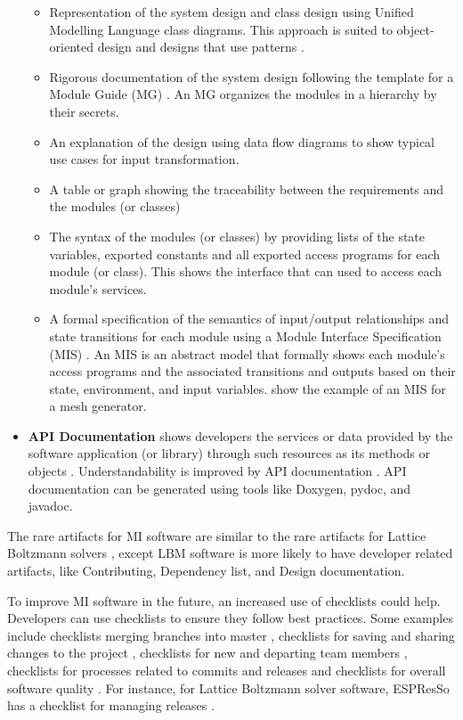 \documentclass[11pt]{article}
\begin{document}
\begin{itemize}
\begin{itemize}
	\item Representation of the system design and class design using Unified
	Modelling Language class diagrams. This approach is suited to
	object-oriented design and designs that use patterns \citep{Gamma1995}.
	\item Rigorous documentation of the system design following the template for
	a Module Guide (MG) \citep{ParnasEtAl1984}.  An MG organizes the modules in
	a hierarchy by their secrets.
	\item An explanation of the design using data flow diagrams to show typical use cases
	for input transformation.
	\item A table or graph showing the traceability between the requirements and
	the modules (or classes)
	\item The syntax of the modules (or classes) by providing lists of the state
	variables, exported constants and all exported access programs for each
	module (or class).  This shows the interface that can used to access each
	module's services.
	\item A formal specification of the semantics of input/output relationships
	and state transitions for each module using a Module Interface Specification
	(MIS) \citep{HoffmanAndStrooper1995}. An MIS is an abstract model that
	formally shows each module's access programs and the associated transitions
	and outputs based on their state, environment, and input variables.
	\citet{ElSheikhEtAl2004, SmithAndYu2009} show the example of an MIS for a
	mesh generator.
\end{itemize}

\item \textbf{API Documentation} shows developers the services or data provided
by the software application (or library) through such resources as its methods
or objects \citep{MengEtAl2018}.  Understandability is improved by API
documentation \citep{MengEtAl2018}. API documentation can be generated using
tools like Doxygen, pydoc, and javadoc.

\end{itemize}

The rare artifacts for MI software are similar to the rare artifacts for Lattice
Boltzmann solvers \citep{Michalski2021}, except LBM software is more likely to
have developer related artifacts, like Contributing, Dependency list, and Design
documentation.

To improve MI software in the future, an increased use of checklists could help.
Developers can use checklists to ensure they follow best practices.  Some
examples include checklists merging branches into master \citep{Brown2015},
checklists for saving and sharing changes to the project \citep{WilsonEtAl2016},
checklists for new and departing team members \citep{HerouxAndBernholdt2018},
checklists for processes related to commits and releases \citep{HerouxEtAl2008}
and checklists for overall software quality \citep{ThielEtAl2020, SSI2022}.  For
instance, for Lattice Boltzmann solver software, ESPResSo has a checklist for
managing releases \citep{Michalski2021}. 
\end{document}
